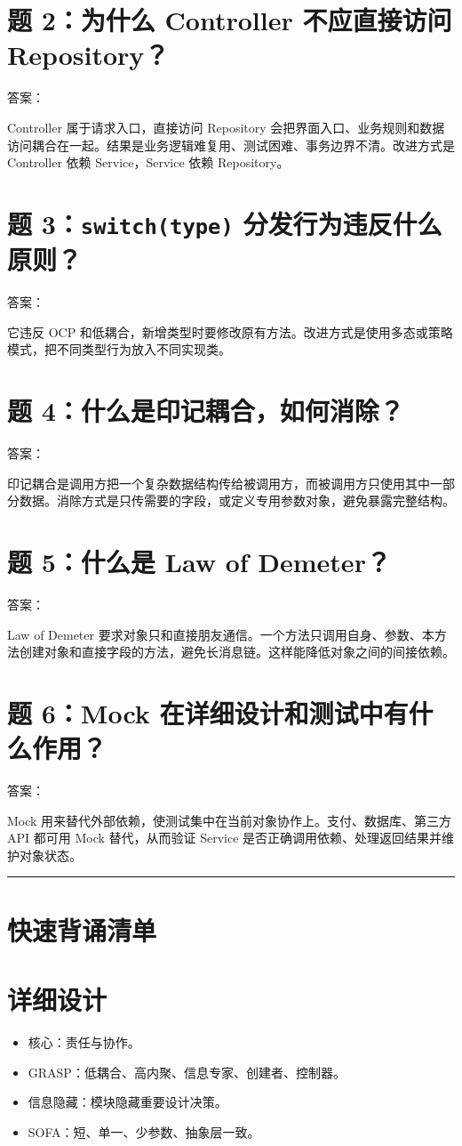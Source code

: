 \documentclass[UTF8,zihao=-4]{ctexart}
\begin{document}
\section{题 2：为什么 Controller 不应直接访问 Repository？}

答案：

Controller 属于请求入口，直接访问 Repository 会把界面入口、业务规则和数据访问耦合在一起。结果是业务逻辑难复用、测试困难、事务边界不清。改进方式是 Controller 依赖 Service，Service 依赖 Repository。

\section{题 3：\texttt{switch(type)} 分发行为违反什么原则？}

答案：

它违反 OCP 和低耦合，新增类型时要修改原有方法。改进方式是使用多态或策略模式，把不同类型行为放入不同实现类。

\section{题 4：什么是印记耦合，如何消除？}

答案：

印记耦合是调用方把一个复杂数据结构传给被调用方，而被调用方只使用其中一部分数据。消除方式是只传需要的字段，或定义专用参数对象，避免暴露完整结构。

\section{题 5：什么是 Law of Demeter？}

答案：

Law of Demeter 要求对象只和直接朋友通信。一个方法只调用自身、参数、本方法创建对象和直接字段的方法，避免长消息链。这样能降低对象之间的间接依赖。

\section{题 6：Mock 在详细设计和测试中有什么作用？}

答案：

Mock 用来替代外部依赖，使测试集中在当前对象协作上。支付、数据库、第三方 API 都可用 Mock 替代，从而验证 Service 是否正确调用依赖、处理返回结果并维护对象状态。

\bigskip\hrule\bigskip

\section{快速背诵清单}

\section{详细设计}

\begin{itemize}
\item 核心：责任与协作。
\item GRASP：低耦合、高内聚、信息专家、创建者、控制器。
\item 信息隐藏：模块隐藏重要设计决策。
\item SOFA：短、单一、少参数、抽象层一致。
\end{itemize}
\end{document}
